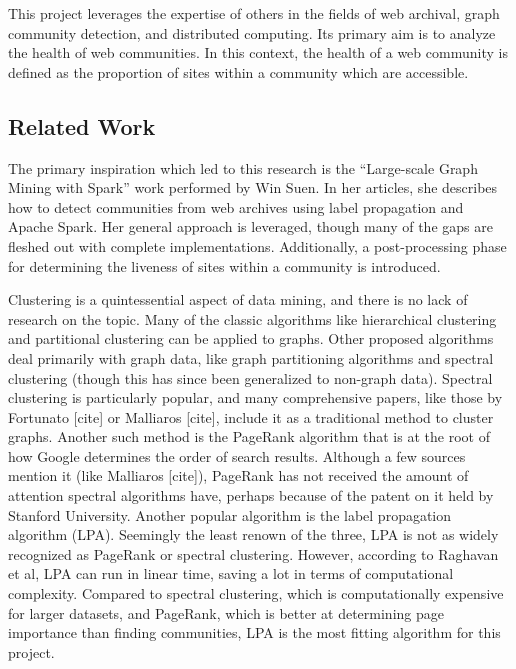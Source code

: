 \documentclass[conference]{IEEEtran}
\begin{document}
This project leverages the expertise of others in the fields of web archival, graph community detection, and distributed computing. Its primary aim is to analyze the health of web communities. In this context, the health of a web community is defined as the proportion of sites within a community which are accessible.

\subsection{Related Work}

The primary inspiration which led to this research is the ``Large-scale Graph Mining with Spark'' work performed by Win Suen. In her articles\cite{largeScaleGraphMiningWithSpark1}\cite{largeScaleGraphMiningWithSpark2}, she describes how to detect communities from web archives using label propagation and Apache Spark. Her general approach is leveraged, though many of the gaps are fleshed out with complete implementations. Additionally, a post-processing phase for determining the liveness of sites within a community is introduced.

Clustering is a quintessential aspect of data mining, and there is no lack of research on the topic. Many of the classic algorithms like hierarchical clustering and partitional clustering can be applied to graphs. Other proposed algorithms deal primarily with graph data, like graph partitioning algorithms and spectral clustering (though this has since been generalized to non-graph data).  Spectral clustering is particularly popular, and many comprehensive papers, like those by Fortunato [cite] or Malliaros [cite], include it as a traditional method to cluster graphs. Another such method is the PageRank algorithm that is at the root of how Google determines the order of search results. Although a few sources mention it (like Malliaros [cite]), PageRank has not received the amount of attention spectral algorithms have, perhaps because of the patent on it held by Stanford University. Another popular algorithm is the label propagation algorithm (LPA). Seemingly the least renown of the three, LPA is not as widely recognized as PageRank or spectral clustering. However, according to Raghavan et al, LPA can run in linear time, saving a lot in terms of computational complexity. Compared to spectral clustering, which is computationally expensive for larger datasets, and PageRank, which is better at determining page importance than finding communities, LPA is the most fitting algorithm for this project.
\end{document}
